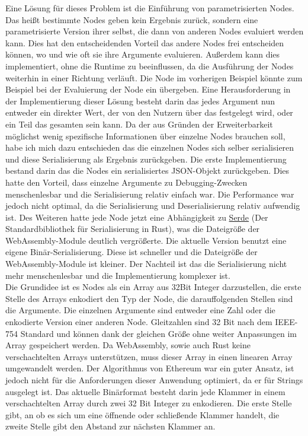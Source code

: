 \documentclass[ngerman]{article}
\begin{document}
Eine Lösung für dieses Problem ist die Einführung von parametrisierten Nodes. Das heißt bestimmte Nodes geben kein Ergebnis zurück, sondern eine parametrisierte Version ihrer selbst, die dann von anderen Nodes evaluiert werden kann.
\br
Dies hat den entscheidenden Vorteil das andere Nodes frei entscheiden können, wo und wie oft sie ihre Argumente evaluieren.
Außerdem kann dies implementiert, ohne die Runtime zu beeinflussen, da die Ausführung der Nodes weiterhin in einer Richtung verläuft.
\br
Die  Node im vorherigen Beispiel könnte zum Beispiel bei der Evaluierung der  Node ein  übergeben.
\br
Eine Herausforderung in der Implementierung dieser Lösung besteht darin das jedes Argument nun entweder ein direkter Wert, der von den Nutzern über das  festgelegt wird, oder ein Teil das gesamten  sein kann.
\br
Da der  aus Gründen der Erweiterbarkeit möglichst wenig spezifische Informationen über einzelne Nodes brauchen soll,
habe ich mich dazu entschieden das die einzelnen Nodes sich selber serialisieren und diese Serialisierung als Ergebnis zurückgeben.
\br
Die erste Implementierung bestand darin das die Nodes ein serialisiertes JSON-Objekt zurückgeben. Dies hatte den Vorteil, dass einzelne Argumente zu Debugging-Zwecken menschenlesbar und die Serialisierung relativ einfach war. Die Performance war jedoch nicht optimal, da die Serialisierung und Deserialisierung relativ aufwendig ist. Des Weiteren hatte jede Node jetzt eine Abhängigkeit zu \href{ https://serde.rs/ }{Serde} (Der Standardbibliothek für Serialisierung in Rust), was die Dateigröße der WebAssembly-Module deutlich vergrößerte.
\br
Die aktuelle Version benutzt eine eigene Binär-Serialisierung. Diese ist schneller und die Dateigröße der WebAssembly-Module ist kleiner. Der Nachteil ist das die Serialisierung nicht mehr menschenlesbar und die Implementierung komplexer ist. 
\\
Die Grundidee ist es Nodes als ein Array aus 32Bit Integer darzustellen, die erste Stelle des Arrays enkodiert den Typ der Node, die darauffolgenden Stellen sind die Argumente. Die einzelnen Argumente sind entweder eine Zahl oder die enkodierte Version einer anderen Node.
Gleitzahlen sind 32 Bit nach dem IEEE-754 Standard und können dank der gleichen Größe ohne weiter Anpassungen im Array gespeichert werden. 
\br
Da WebAssembly, sowie auch Rust keine verschachtelten Arrays unterstützen, muss dieser Array in einen linearen Array umgewandelt werden. 
Der  Algorithmus von Ethereum war ein guter Ansatz, ist jedoch nicht für die Anforderungen dieser Anwendung optimiert, da er für Strings ausgelegt ist. 
\cite{wood2024ethereum}
\br
Das aktuelle Binärformat besteht darin jede Klammer in einem verschachtelten Array durch zwei 32 Bit Integer zu enkodieren. 
Die erste Stelle gibt, an ob es sich um eine öffnende oder schließende Klammer handelt, die zweite Stelle gibt den Abstand zur nächsten Klammer an.
\end{document}
